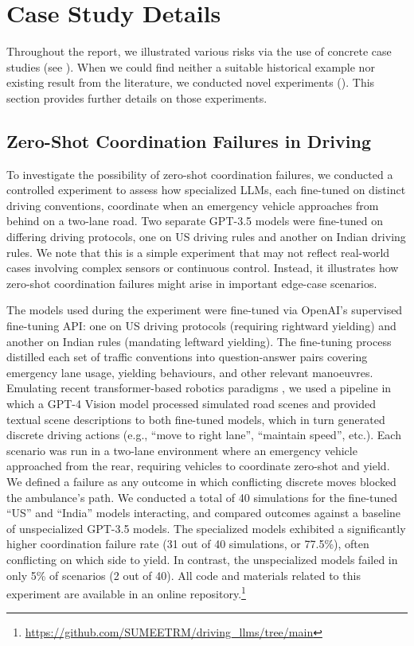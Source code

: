 \section{Case Study Details}
\label{app:case_study_details}

Throughout the report, we illustrated various risks via the use of concrete case studies (see ).
When we could find neither a suitable historical example nor existing result from the literature, we conducted novel experiments ().
This section provides further details on those experiments.

\subsection{Zero-Shot Coordination Failures in Driving}


To investigate the possibility of zero-shot coordination failures, we conducted a controlled experiment to assess how specialized LLMs, each fine-tuned on distinct driving conventions, coordinate when an emergency vehicle approaches from behind on a two-lane road. Two separate GPT-3.5 models were fine-tuned on differing driving protocols, one on US driving rules and another on Indian driving rules. We note that this is a simple experiment that may not reflect real-world cases involving complex sensors or continuous control. Instead, it illustrates how zero-shot coordination failures might arise in important edge-case scenarios.


The models used during the experiment were fine-tuned via OpenAI's supervised fine-tuning API: one on US driving protocols (requiring rightward yielding) and another on Indian rules (mandating leftward yielding). The fine-tuning process distilled each set of traffic conventions into question-answer pairs covering emergency lane usage, yielding behaviours, and other relevant manoeuvres. Emulating recent transformer-based robotics paradigms \citep[e.g.,][]{open_x_embodiment_rt_x_2023}, we used a pipeline in which a GPT-4 Vision model processed simulated road scenes and provided textual scene descriptions to both fine-tuned models, which in turn generated discrete driving actions (e.g., ``move to right lane'', ``maintain speed'', etc.). Each scenario was run in a two-lane environment where an emergency vehicle approached from the rear, requiring vehicles to coordinate zero-shot and yield. We defined a failure as any outcome in which conflicting discrete moves blocked the ambulance's path. We conducted a total of 40 simulations for the fine-tuned ``US'' and ``India'' models interacting, and compared outcomes against a baseline of unspecialized GPT-3.5 models. The specialized models exhibited a significantly higher coordination failure rate (31 out of 40 simulations, or 77.5\%), often conflicting on which side to yield. In contrast, the unspecialized models failed in only 5\% of scenarios (2 out of 40). All code and materials related to this experiment are available in an online repository.\footnote{\url{https://github.com/SUMEETRM/driving_llms/tree/main}}

